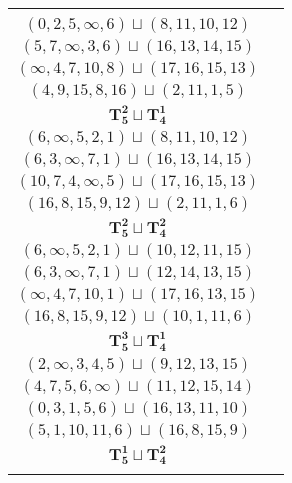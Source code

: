 \documentclass{article}
\begin{document}
\begin{longtable}{|c|c|}
\begin{tabular}{c}
        $(5,4,2,\infty,1)\sqcup(11,13,12,15)$ \\ 
        $(0,2,5,\infty,6)\sqcup(8,11,10,12)$ \\ 
        $(5,7,\infty,3,6)\sqcup(16,13,14,15)$ \\ 
        $(\infty,4,7,10,8)\sqcup(17,16,15,13)$ \\ 
        $(4,9,15,8,16)\sqcup(2,11,1,5)$
        \end{tabular} \\ 
        \hline
        $\mathbf{T_{5}^{2}} \sqcup \mathbf{T_{4}^{1}}$ & \begin{tabular}{c}
        $(\infty,2,4,5,0)\sqcup(11,13,12,15)$ \\ 
        $(6,\infty,5,2,1)\sqcup(8,11,10,12)$ \\ 
        $(6,3,\infty,7,1)\sqcup(16,13,14,15)$ \\ 
        $(10,7,4,\infty,5)\sqcup(17,16,15,13)$ \\ 
        $(16,8,15,9,12)\sqcup(2,11,1,6)$
        \end{tabular} \\ 
        \hline
        $\mathbf{T_{5}^{2}} \sqcup \mathbf{T_{4}^{2}}$ & \begin{tabular}{c}
        $(\infty,2,4,3,0)\sqcup(11,13,12,15)$ \\ 
        $(6,\infty,5,2,1)\sqcup(10,12,11,15)$ \\ 
        $(6,3,\infty,7,1)\sqcup(12,14,13,15)$ \\ 
        $(\infty,4,7,10,1)\sqcup(17,16,13,15)$ \\ 
        $(16,8,15,9,12)\sqcup(10,1,11,6)$
        \end{tabular} \\ 
        \hline
        $\mathbf{T_{5}^{3}} \sqcup \mathbf{T_{4}^{1}}$ & \begin{tabular}{c}
        $(0,2,1,3,4)\sqcup(11,8,\infty,6)$ \\ 
        $(2,\infty,3,4,5)\sqcup(9,12,13,15)$ \\ 
        $(4,7,5,6,\infty)\sqcup(11,12,15,14)$ \\ 
        $(0,3,1,5,6)\sqcup(16,13,11,10)$ \\ 
        $(5,1,10,11,6)\sqcup(16,8,15,9)$
        \end{tabular} \\ 
        \hline
        $\mathbf{T_{5}^{1}} \sqcup \mathbf{T_{4}^{2}}$ & \begin{tabular}{c}
        $(10,13,\infty,8,11)\sqcup(1,2,3,4)$ \\ 

\end{tabular}
\end{longtable}
\end{document}
